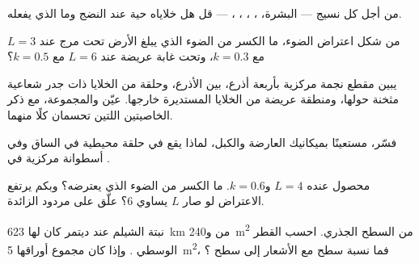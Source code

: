 \begin{exercise}[$\star$]\label{exo:b1:flowering-plant-organization:3}
من أجل كل نسيج --- البشرة، ، ، ،
،  --- قل هل خلاياه حية عند النضج وما الذي يفعله.
\end{exercise}

\begin{exercise}[$\star$]\label{exo:b1:flowering-plant-organization:4}
من شكل اعتراض الضوء، ما الكسر من الضوء الذي يبلغ الأرض تحت مرج عند
$L = 3$ مع $k = 0.3$، وتحت غابة عريضة  عند $L = 6$ مع
$k = 0.5$؟
\end{exercise}

\begin{exercise}[$\star\star$]\label{exo:b1:flowering-plant-organization:5}
يبين مقطع نجمة  مركزية بأربعة أذرع،  بين الأذرع، وحلقة من
الخلايا ذات جدر شعاعية مثخنة حولها، ومنطقة عريضة من الخلايا
المستديرة خارجها. عيّن  والمجموعة، مع ذكر الخاصيتين اللتين
تحسمان كلًا منهما.
\end{exercise}

\begin{exercise}[$\star\star$]\label{exo:b1:flowering-plant-organization:6}
فسّر، مستعينًا بميكانيك العارضة والكبل، لماذا يقع  في
حلقة محيطية في الساق وفي أسطوانة مركزية في .
\end{exercise}

\begin{exercise}[$\star\star$]\label{exo:b1:flowering-plant-organization:7}
محصول عنده $L = 4$ و$k = 0.6$. ما الكسر من الضوء الذي يعترضه؟ وبكم
يرتفع الاعتراض لو صار $L$ يساوي 6؟ علّق على مردود  الزائدة.
\end{exercise}

\begin{exercise}[$\star\star$]\label{exo:b1:flowering-plant-organization:8}
نبتة الشيلم عند ديتمر كان لها \qty{623}{km} من 
و\qty{240}{m^2} من السطح الجذري. احسب القطر الوسطي . وإذا كان
مجموع أوراقها \qty{5}{m^2}، فما نسبة سطح  مع الأشعار إلى سطح
؟
\end{exercise}

